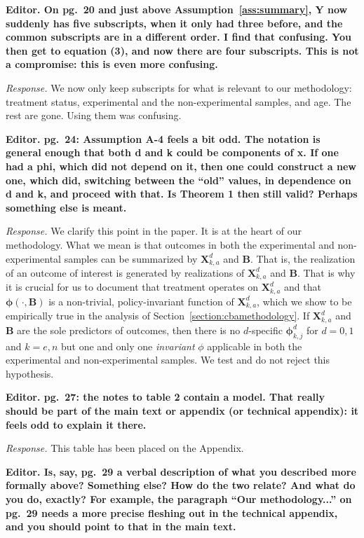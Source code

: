 \noindent \textbf{Editor. On pg.\ 20 and just above Assumption~\ref{ass:summary}, Y now suddenly has five subscripts, when it only had three before, and the common subscripts are in a different order. I find that confusing. You then get to equation (3), and now there are four subscripts. This is not a compromise: this is even more confusing.}

\noindent \textit{Response.} We now only keep subscripts for what is relevant to our methodology: treatment status, experimental and the non-experimental samples, and age. The rest are gone. Using them was confusing.

\noindent \textbf{Editor.  pg.\ 24: Assumption A-4 feels a bit odd. The notation is general enough that both d and k could be components of x. If one had a phi, which did not depend on it, then one could construct a new one, which did, switching between the ``old'' values, in dependence on d and k, and proceed with that. Is Theorem 1 then still valid? Perhaps something else is meant.}

\noindent \textit{Response.} We  clarify this point in the paper. It is at the heart of our methodology. What we mean is that outcomes in both the experimental and non-experimental samples can be summarized by $\bm{X}_{k,a}^d$ and $\bm{B}$. That is, the realization of an outcome of interest is generated by realizations of $\bm{X}_{k,a}^d$ and $\bm{B}$. That is why it is crucial for us to document that treatment operates on $\bm{X}_{k,a}^d$ and that $\bm{\phi} \left( \cdot, \bm{B} \right)$ is a non-trivial, policy-invariant function of $\bm{X}_{k,a}^d$, which we show to be empirically true in the analysis of Section~\ref{section:cbamethodology}. If $\bm{X}_{k,a}^d$ and $\bm{B}$ are the sole predictors of outcomes, then there is no $d$-specific $\bm{\phi}_{k,j}^d$ for $d=0,1$ and $k = e,n$ but one and only one \textit{invariant} $\phi$ applicable in both the experimental and non-experimental samples. We test and do not reject this hypothesis.

\noindent \textbf{Editor. pg.\ 27: the notes to table 2 contain a model. That really should be part of the main text or appendix (or technical appendix): it feels odd to explain it there.}

\noindent \textit{Response.} This table has been placed on the Appendix.

\noindent \textbf{Editor. Is, say, pg.\ 29 a verbal description of what you described more formally above? Something else? How do the two relate? And what do you do, exactly? For example, the paragraph ``Our methodology...'' on pg.\ 29 needs a more precise fleshing out in the technical appendix, and you should point to that in the main text.}


